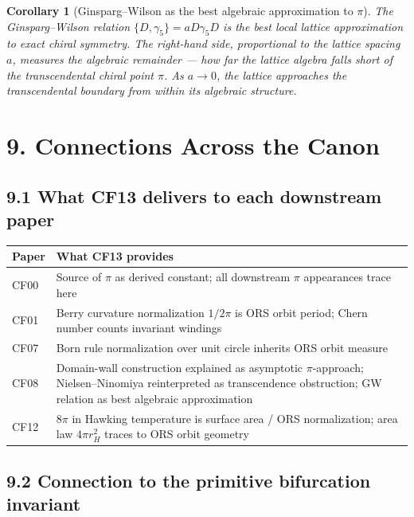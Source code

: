 \documentclass[11pt]{article}
\newtheorem{corollary}[theorem]{Corollary}
\theoremstyle{definition}
\theoremstyle{remark}
\begin{document}
\begin{corollary}[Ginsparg--Wilson as the best algebraic approximation to $\pi$]
The Ginsparg--Wilson relation $\{D,\gamma_5\}=aD\gamma_5 D$ is the
best local lattice approximation to exact chiral symmetry. The
right-hand side, proportional to the lattice spacing $a$, measures
the algebraic remainder --- how far the lattice algebra falls short of
the transcendental chiral point $\pi$. As $a\to 0$, the lattice
approaches the transcendental boundary from within its algebraic
structure.
\end{corollary}

\section{9. Connections Across the Canon}

\subsection{9.1 What CF13 delivers to each downstream paper}

\begin{longtable}{p{}p{}}
\toprule
\textbf{Paper} & \textbf{What CF13 provides} \\
\midrule
CF00 & Source of $\pi$ as derived constant; all downstream $\pi$
appearances trace here \\
CF01 & Berry curvature normalization $1/2\pi$ is ORS orbit period;
Chern number counts invariant windings \\
CF07 & Born rule normalization over unit circle inherits ORS orbit
measure \\
CF08 & Domain-wall construction explained as asymptotic $\pi$-approach;
Nielsen--Ninomiya reinterpreted as transcendence obstruction; GW
relation as best algebraic approximation \\
CF12 & $8\pi$ in Hawking temperature is surface area / ORS
normalization; area law $4\pi r_H^2$ traces to ORS orbit geometry \\
\bottomrule
\end{longtable}

\subsection{9.2 Connection to the primitive bifurcation invariant}
\end{document}
